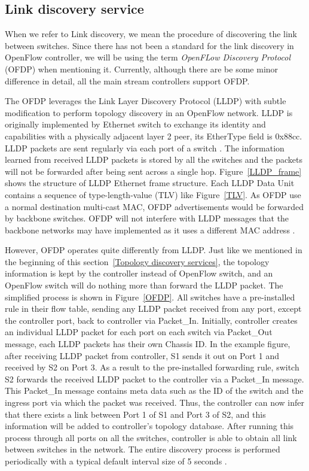 \subsection{Link discovery service}
\label{Link discovery service}
When we refer to Link discovery, we mean the procedure of discovering the link between switches. Since there has not been a standard for the link discovery in OpenFlow controller, we will be using the term \textit{OpenFLow Discovery Protocol} (OFDP) when mentioning it. Currently, although there are be some minor difference in detail, all the main stream controllers support OFDP.

The OFDP leverages the Link Layer Discovery Protocol (LLDP) with subtle modification to perform topology discovery in an OpenFlow network. LLDP is originally implemented by Ethernet switch to exchange its identity and capabilities with a physically adjacent layer 2 peer, its EtherType field is 0x88cc. LLDP packets are sent regularly via each port of a switch \cite{LLDP_WS}. The information learned from received LLDP packets is stored by all the switches and the packets will not be forwarded after being sent across a single hop. Figure~\ref{LLDP_frame} shows the structure of LLDP Ethernet frame structure. Each LLDP Data Unit contains a sequence of type-length-value (TLV) like Figure~\ref{TLV}. As OFDP use a normal destination multi-cast MAC, OFDP advertisements would be forwarded by backbone switches. OFDP will not interfere with LLDP messages that the backbone networks may have implemented as it uses a different MAC address \cite{OFDP_GENI}. 

However, OFDP operates quite differently from LLDP. Just like we mentioned in the beginning of this section~\ref{Topology discovery services}, the topology information is kept by the controller instead of OpenFlow switch, and an OpenFlow switch will do nothing more than forward the LLDP packet. The simplified process is shown in Figure~\ref{OFDP}. All switches have a pre-installed rule in their flow table, sending any LLDP packet received from any port, except the controller port, back to controller via Packet\_In. Initially, controller creates an individual LLDP packet for each port on each switch via Packet\_Out message, each LLDP packets has their own Chassis ID. In the example figure, after receiving LLDP packet from controller, S1 sends it out on Port 1 and received by S2 on Port 3. As a result to the pre-installed forwarding rule, switch S2 forwards the received LLDP packet to the controller via a Packet\_In message. This Packet\_In message contains meta data such as the ID of the switch and the ingress port via which the packet was received. Thus, the controller can now infer that there exists a link between Port 1 of S1 and Port 3 of S2, and this information will be added to controller's topology database. After running this process through all ports on all the switches, controller is able to obtain all link between switches in the network. The entire discovery process is performed periodically with a typical default interval size of 5 seconds \cite{PPTI14}. 

